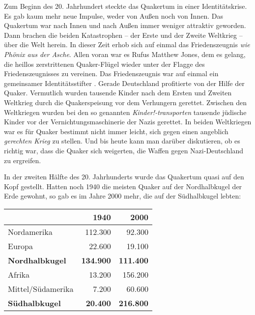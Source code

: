 Zum Beginn des 20. Jahrhundert steckte das Quakertum in einer Identitätskrise.
Es gab kaum mehr neue Impulse, weder von Außen 
noch von Innen. Das Quakertum war
nach Innen und nach Außen immer weniger attraktiv geworden. Dann brachen die
beiden Katastrophen -- der Erste und der Zweite Weltkrieg --
über die Welt
herein. In dieser Zeit erhob sich auf einmal das Friedenszeugnis
\textit{wie
Phönix aus der Asche}. Allen voran war es Rufus Matthew Jones,
 dem
es gelang, die heillos zerstrittenen Quaker-Flügel wieder unter der Flagge des
Friedenszeugnisses zu vereinen. Das Friedenszeugnis war auf einmal ein
gemeinsamer Identitätsstifter . Gerade Deutschland
 profitierte von der Hilfe der
Quaker. Vermutlich wurden tausende Kinder nach dem Ersten und Zweiten Weltkrieg
durch die Quakerspeisung  vor dem Verhungern gerettet.
Zwischen den Weltkriegen
wurden bei den so genannten \textit{Kinder!-transporten}
tausende jüdische Kinder 
vor der Vernichtungsmaschinerie der Nazis gerettet. In beiden Weltkriegen war es
für Quaker bestimmt nicht immer leicht, sich gegen einen 
angeblich \textit{gerechten
Krieg} zu stellen. Und bis heute kann man darüber diskutieren, ob es richtig
war, dass die Quaker sich weigerten, die Waffen gegen Nazi-Deutschland zu
ergreifen.

\medskip

In der zweiten Hälfte des 20. Jahrhunderts wurde das Quakertum quasi auf den
Kopf
gestellt. Hatten noch 1940 die meisten Quaker auf der Nordhalbkugel der Erde
gewohnt, so gab es im Jahre 2000 mehr, die auf der Südhalbkugel lebten:

\begin{center}
\begin{tabular}{|l|r|r|} \hline
                        & \textbf{1940}        & \textbf{2000}    \\ \hline
\hline
Nordamerika             & 112.300              & 92.300           \\ \hline
Europa                  & 22.600               & 19.100           \\ \hline
\textbf{Nordhalbkugel}  & \textbf{134.900}     & \textbf{111.400} \\ \hline
Afrika                  & 13.200               & 156.200          \\ \hline
Mittel/Südamerika       & 7.200                & 60.600           \\ \hline
\textbf{Südhalbkugel}   & \textbf{20.400}      & \textbf{216.800} \\ \hline
\end{tabular}
\end{center}


